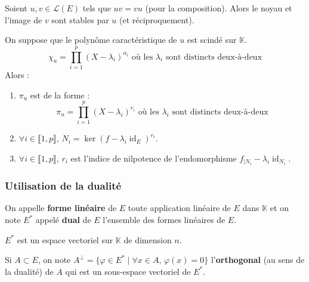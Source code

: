   \begin{proposition}
    Soient $u, v \in \mathcal{L}(E)$ tels que $uv = vu$ (pour la composition). Alors le noyau et l'image de $v$ sont stables par $u$ (et réciproquement).
  \end{proposition}


  \begin{proposition}
    On suppose que le polynôme caractéristique de $u$ est scindé sur $\mathbb{K}$.
    \[ \chi_u = \prod_{i=1}^p (X - \lambda_i)^{\alpha_i} \text{ où les } \lambda_i \text{ sont distincts deux-à-deux} \]
    Alors :
    \begin{enumerate}[label={\bfseries(\roman*)}]
      \item $\pi_u$ est de la forme :
      \[ \pi_u = \prod_{i=1}^p (X - \lambda_i)^{r_i} \text{ où les } \lambda_i \text{ sont distincts deux-à-deux} \]
      \item $\forall i \in \llbracket 1, p \rrbracket$, $N_i = \ker{(f - \lambda_i \operatorname{id}_E )^{r_i}}$.
      \item $\forall i \in \llbracket 1, p \rrbracket$, $r_i$ est l'indice de nilpotence de l'endomorphisme $f_{|N_i} - \lambda_i \operatorname{id}_{N_i}$.
    \end{enumerate}
  \end{proposition}

  \subsubsection{Utilisation de la dualité}


  \begin{definition}
    On appelle \textbf{forme linéaire} de $E$ toute application linéaire de $E$ dans $\mathbb{K}$ et on note $E^*$ appelé \textbf{dual} de $E$ l'ensemble des formes linéaires de $E$.
  \end{definition}

  \begin{proposition}
    $E^*$ est un espace vectoriel sur $\mathbb{K}$ de dimension $n$.
  \end{proposition}

  \begin{definition}
    Si $A \subset E$, on note $A^\perp = \{ \varphi \in E^* \mid \forall x \in A, \, \varphi(x) = 0 \}$ l'\textbf{orthogonal} (au sens de la dualité) de $A$ qui est un sous-espace vectoriel de $E^*$.
  \end{definition}

